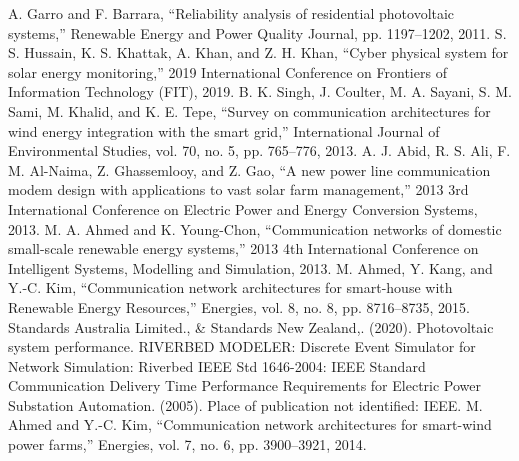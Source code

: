 \documentclass[conference, letterpaper]{IEEEtran}
\begin{document}
\begin{thebibliography}{00}
 A. Garro and F. Barrara, “Reliability analysis of residential photovoltaic systems,” Renewable Energy and Power Quality Journal, pp. 1197–1202, 2011. 
 S. S. Hussain, K. S. Khattak, A. Khan, and Z. H. Khan, “Cyber physical system for solar energy monitoring,” 2019 International Conference on Frontiers of Information Technology (FIT), 2019. 
 B. K. Singh, J. Coulter, M. A. Sayani, S. M. Sami, M. Khalid, and K. E. Tepe, “Survey on communication architectures for wind energy integration with the smart grid,” International Journal of Environmental Studies, vol. 70, no. 5, pp. 765–776, 2013.
 A. J. Abid, R. S. Ali, F. M. Al-Naima, Z. Ghassemlooy, and Z. Gao, “A new power line communication modem design with applications to vast solar farm management,” 2013 3rd International Conference on Electric Power and Energy Conversion Systems, 2013.
 M. A. Ahmed and K. Young-Chon, “Communication networks of domestic small-scale renewable energy systems,” 2013 4th International Conference on Intelligent Systems, Modelling and Simulation, 2013.
 M. Ahmed, Y. Kang, and Y.-C. Kim, “Communication network architectures for smart-house with Renewable Energy Resources,” Energies, vol. 8, no. 8, pp. 8716–8735, 2015.
 Standards Australia Limited., \& Standards New Zealand,. (2020). Photovoltaic system performance. 
 RIVERBED MODELER: Discrete Event Simulator for Network Simulation: Riverbed
 IEEE Std 1646-2004: IEEE Standard Communication Delivery Time Performance Requirements for Electric Power Substation Automation. (2005). Place of publication not identified: IEEE.
 M. Ahmed and Y.-C. Kim, “Communication network architectures for  smart-wind power farms,” Energies, vol. 7, no. 6, pp. 3900–3921, 2014.


\end{thebibliography}
\end{document}
